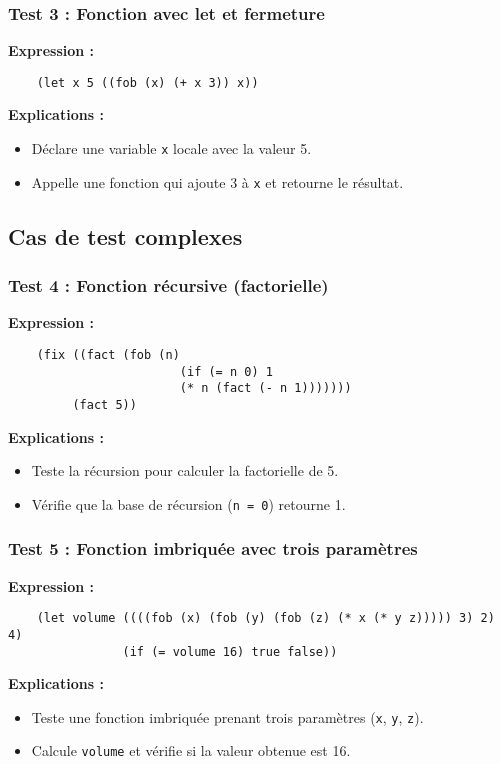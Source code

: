 \documentclass{article}
\begin{document}
\subsubsection*{Test 3 : Fonction avec let et fermeture} 
\hspace{.5cm}\textbf{Expression :} 
\begin{verbatim} 
    (let x 5 ((fob (x) (+ x 3)) x)) 
\end{verbatim} 
\hspace{.5cm}\textbf{Explications :} 
\begin{itemize}[left=1cm] 
    \item Déclare une variable \texttt{x} locale avec la valeur 5. 
    \item Appelle une fonction qui ajoute 3 à \texttt{x} et retourne le résultat. 
\end{itemize}

\subsection{Cas de test complexes}
\subsubsection*{Test 4 : Fonction récursive (factorielle)} 
\hspace{.5cm}\textbf{Expression :} 
\begin{verbatim} 
    (fix ((fact (fob (n) 
                        (if (= n 0) 1 
                        (* n (fact (- n 1))))))) 
         (fact 5)) 
\end{verbatim} 
\hspace{.5cm}\textbf{Explications :} 
\begin{itemize}[left=1cm]
    \item Teste la récursion pour calculer la factorielle de 5. 
    \item Vérifie que la base de récursion (\texttt{n = 0}) retourne 1. 
\end{itemize}
\subsubsection*{Test 5 : Fonction imbriquée avec trois paramètres} 
\hspace{.5cm}\textbf{Expression :} 
\begin{verbatim} 
    (let volume ((((fob (x) (fob (y) (fob (z) (* x (* y z))))) 3) 2) 4) 
                (if (= volume 16) true false))
\end{verbatim} 
\hspace{.5cm}\textbf{Explications :} 
\begin{itemize}[left=1cm]
    \item Teste une fonction imbriquée prenant trois paramètres (\texttt{x}, \texttt{y}, \texttt{z}). 
    \item Calcule \texttt{volume} et vérifie si la valeur obtenue est 16. 
\end{itemize}
\end{document}
